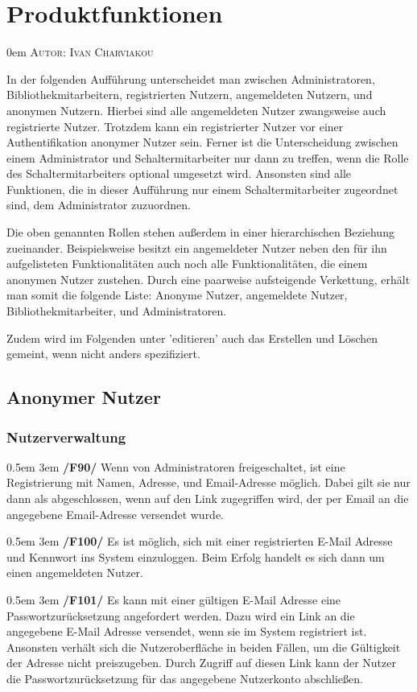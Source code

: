 \documentclass{article}
\makeatletter
\newcommand{\sectionauthor}[1]{
	{\parindent 0em \large \scshape Autor: #1 \par \nobreak \vspace*{2em}}
	\@afterheading
}
\newcommand{\specification}[3]{
	{\parindent 0.5em \hangindent 3em \hypertarget{spec:#1:#2}{\textbf{/#1#2/}} #3 \par \nobreak \vspace*{0.5em}}
}
\makeatother
\begin{document}
\section{Produktfunktionen} %
\sectionauthor{Ivan Charviakou}

In der folgenden Aufführung unterscheidet man zwischen Administratoren, Bibliothekmitarbeitern, registrierten Nutzern, angemeldeten Nutzern, und anonymen Nutzern.
Hierbei sind alle angemeldeten Nutzer zwangsweise auch registrierte Nutzer. Trotzdem kann ein registrierter Nutzer vor einer Authentifikation anonymer Nutzer sein.
Ferner ist die Unterscheidung zwischen einem Administrator und Schaltermitarbeiter nur dann zu treffen, wenn die Rolle des Schaltermitarbeiters optional umgesetzt wird.
Ansonsten sind alle Funktionen, die in dieser Aufführung nur einem Schaltermitarbeiter zugeordnet sind, dem Administrator zuzuordnen. \vspace{0.5em}

Die oben genannten Rollen stehen außerdem in einer hierarchischen Beziehung zueinander.
Beispielsweise besitzt ein angemeldeter Nutzer neben den für ihn aufgelisteten Funktionalitäten auch noch alle Funktionalitäten, die einem anonymen Nutzer zustehen.
Durch eine paarweise aufsteigende Verkettung, erhält man somit die folgende Liste: Anonyme Nutzer, angemeldete Nutzer, Bibliothekmitarbeiter, und Administratoren. \vspace{0.5em}

Zudem wird im Folgenden unter 'editieren' auch das Erstellen und Löschen gemeint, wenn nicht anders spezifiziert. \vspace{0.5em}

\subsection{Anonymer Nutzer}
	\subsubsection{Nutzerverwaltung}
		\specification{F}{90}{Wenn von Administratoren freigeschaltet, ist eine Registrierung mit Namen, Adresse, und Email-Adresse möglich. 
			Dabei gilt sie nur dann als abgeschlossen, wenn auf den Link zugegriffen wird, der per Email an die angegebene Email-Adresse versendet wurde. }
		\specification{F}{100}{Es ist möglich, sich mit einer registrierten E-Mail Adresse und Kennwort ins System einzuloggen. Beim Erfolg handelt es sich dann um einen angemeldeten Nutzer. }
		\specification{F}{101}{Es kann mit einer gültigen E-Mail Adresse eine Passwortzurücksetzung angefordert werden. 
			Dazu wird ein Link an die angegebene E-Mail Adresse versendet, wenn sie im System registriert ist. Ansonsten verhält sich die Nutzeroberfläche in beiden Fällen, um die Gültigkeit der Adresse nicht preiszugeben.
			Durch Zugriff auf diesen Link kann der Nutzer die Passwortzurücksetzung für das angegebene Nutzerkonto abschließen. }
\end{document}
